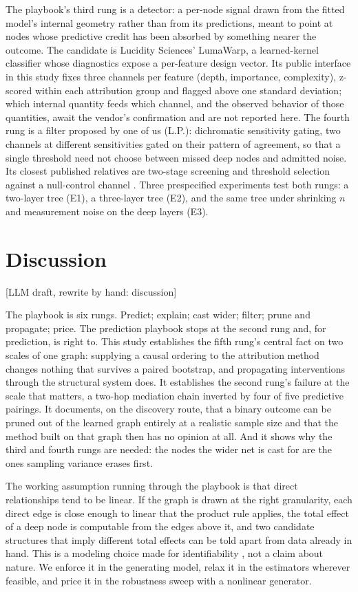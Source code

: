 \documentclass[11pt]{article}
\newcommand{\draftnote}[1]{\textcolor{blue!60!black}{[LLM draft, rewrite by hand: #1]}}
\begin{document}
The playbook's third rung is a detector: a per-node signal drawn from the
fitted model's internal geometry rather than from its predictions, meant to
point at nodes whose predictive credit has been absorbed by something nearer
the outcome. The candidate is Lucidity Sciences' LumaWarp, a learned-kernel
classifier whose diagnostics expose a per-feature design vector. Its public
interface in this study fixes three channels per feature (depth, importance,
complexity), z-scored within each attribution group and flagged above one
standard deviation; which internal quantity feeds which channel, and the
observed behavior of those quantities, await the vendor's confirmation and
are not reported here. The fourth rung is a filter proposed by one of us
(L.P.): dichromatic sensitivity gating, two channels at different
sensitivities gated on their pattern of agreement, so that a single
threshold need not choose between missed deep nodes and admitted noise. Its
closest published relatives are two-stage screening \citep{FanLv2008} and
threshold selection against a null-control channel \citep{BarberCandes2015}.
Three prespecified experiments test both rungs: a two-layer tree (E1), a
three-layer tree (E2), and the same tree under shrinking $n$ and measurement
noise on the deep layers (E3).

\section{Discussion}
\draftnote{discussion}

The playbook is six rungs. Predict; explain; cast wider; filter; prune and
propagate; price. The prediction playbook stops at the second rung and, for
prediction, is right to. This study establishes the fifth rung's central
fact on two scales of one graph: supplying a causal ordering to the
attribution method changes nothing that survives a paired bootstrap, and
propagating interventions through the structural system does. It establishes
the second rung's failure at the scale that matters, a two-hop mediation
chain inverted by four of five predictive pairings. It documents, on the
discovery route, that a binary outcome can be pruned out of the learned graph
entirely at a realistic sample size and that the method built on that graph
then has no opinion at all. And it shows why the third and fourth rungs are
needed: the nodes the wider net is cast for are the ones sampling variance
erases first.

The working assumption running through the playbook is that direct
relationships tend to be linear. If the graph is drawn at the right
granularity, each direct edge is close enough to linear that the product
rule applies, the total effect of a deep node is computable from the edges
above it, and two candidate structures that imply different total effects
can be told apart from data already in hand. This is a modeling choice made
for identifiability \citep{Shimizu2006,Hoyer2009,Peters2017}, not a claim
about nature. We enforce it in the generating model, relax it in the
estimators wherever feasible, and price it in the robustness sweep with a
nonlinear generator.
\end{document}
